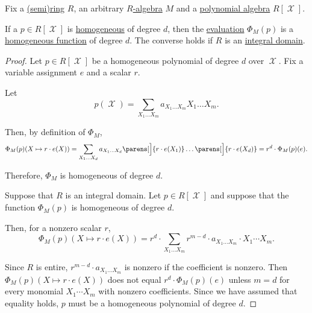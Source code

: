\begin{proposition}\label{thm:homogeneous_polynomial_iff_homogeneous_function}
  Fix a \hyperref[def:semiring]{(semi)ring} \( R \), an arbitrary \hyperref[def:algebra_over_semiring]{\( R \)-algebra} \( M \) and a \hyperref[def:polynomial_algebra]{polynomial algebra} \( R[\mscrX] \).

  If a \( p \in R[\mscrX] \) is \hyperref[def:homogeneous_polynomial]{homogeneous} of degree \( d \), then the \hyperref[con:evaluation_homomorphism]{evaluation} \( \Phi_M(p) \) is a \hyperref[def:real_homogeneous_function]{homogeneous function} of degree \( d \). The converse holds if \( R \) is an \hyperref[def:integral_domain]{integral domain}.
\end{proposition}
\begin{proof}
  \SufficiencySubProof Let \( p \in R[\mscrX] \) be a homogeneous polynomial of degree \( d \) over \( \mscrX \). Fix a variable assignment \( e \) and a scalar \( r \).

  Let
  \begin{equation*}
    p(\mscrX) = \sum_{X_1 \ldots X_m} a_{X_1 \ldots X_m} X_1 \ldots X_m.
  \end{equation*}

  Then, by definition of \( \Phi_M \),
  \begin{equation*}
    \Phi_M(p)(X \mapsto r \cdot e(X))
    =
    \sum_{X_1 \ldots X_d} a_{X_1 \ldots X_d} \parens[\Big]{ r \cdot e(X_1) } \ldots \parens[\Big]{ r \cdot e(X_d) }
    =
    r^d \cdot \Phi_M(p)(e).
  \end{equation*}

  Therefore, \( \Phi_M \) is homogeneous of degree \( d \).

  \NecessitySubProof Suppose that \( R \) is an integral domain. Let \( p \in R[\mscrX] \) and suppose that the function \( \Phi_M(p) \) is homogeneous of degree \( d \).

  Then, for a nonzero scalar \( r \),
  \begin{equation*}
    \Phi_M(p)(X \mapsto r \cdot e(X))
    =
    r^d \cdot \sum_{X_1 \ldots X_m} r^{m - d} \cdot a_{X_1 \ldots X_m} \cdot X_1 \cdots X_m.
  \end{equation*}

  Since \( R \) is entire, \( r^{m - d} \cdot a_{X_1 \ldots X_m} \) is nonzero if the coefficient is nonzero. Then \( \Phi_M(p)(X \mapsto r \cdot e(X)) \) does not equal \( r^d \cdot \Phi_M(p)(e) \) unless \( m = d \) for every monomial \( X_1 \cdots X_m \) with nonzero coefficients. Since we have assumed that equality holds, \( p \) must be a homogeneous polynomial of degree \( d \).
\end{proof}

